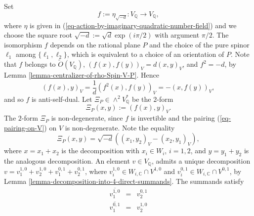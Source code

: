\documentclass[12pt]{amsart}
\numberwithin{equation}{subsection}
\theoremstyle{plain}
\theoremstyle{definition}
\newcommand{\CC}{{\mathbb C}}
\newcommand{\QQ}{{\mathbb Q}}
\newcommand{\cm}{\eta}
\begin{document}
 
Set 
\begin{equation}
\label{eq-f}
f:=\cm_{\sqrt{-d}}:V_\QQ\rightarrow V_\QQ, 
\end{equation}
where $\cm$ is given in (\ref{eq-action-by-imaginary-quadratic-number-field}) and we choose the square root $\sqrt{-d}:=\sqrt{d}\exp(i\pi/2)$ with argument $\pi/2$. 
The isomorphism $f$ depends on the rational plane $P$ and the choice of the pure spinor $\ell_1$ among $\{\ell_1,\ell_2\}$, which is equivalent to a choice of an orientation of $P$. 
Note that $f$ belongs to $\tilde{O}(V_\QQ)$, $(f(x),f(y))_V=d(x,y)_V$, and $f^2=-d$, by Lemma \ref{lemma-centralizer-of-rho-Spin-V-P}. Hence 
\[
(f(x),y)_V=\frac{1}{d}(f^2(x),f(y))_V=-(x,f(y))_V,
\]
and so $f$ is anti-self-dual.
Let $\Xi_P\in \wedge^2V_\QQ^*$ be the $2$-form
\begin{equation}
\label{eq-Xi}
\Xi_P(x,y):=(f(x),y)_V.
\end{equation}
The $2$-form $\Xi_P$ is non-degenerate, since $f$ is invertible and the pairing  (\ref{eq-pairing-on-V}) on $V$ is non-degenerate.
Note the equality
\[
\Xi_P(x,y)=\sqrt{-d}\left((x_1,y_2)_V-(x_2,y_1)_V\right),
\]
where $x=x_1+x_2$ is the decomposition with $x_i\in W_i$, $i=1,2$, and $y=y_1+y_2$ is the analogous decomposition.
An element $v\in V_\QQ$, admits a unique decomposition $v=v_1^{1,0}+v_2^{1,0}+v_1^{0,1}+v_2^{0,1}$, where
$v_i^{1,0}\in W_{i,\CC}\cap V^{1,0}$ and $v_i^{0,1}\in W_{i,\CC}\cap V^{0,1}$, by Lemma \ref{lemma-decomposition-into-4-direct-summands}. The summands satisfy
\begin{eqnarray*}
\overline{v_1^{1,0}}&=& v_2^{0,1}
\\
\overline{v_1^{0,1}}&=& v_2^{1,0}
\end{eqnarray*}
\end{document}
